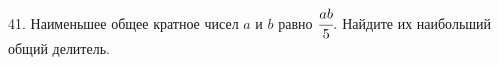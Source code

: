 41. Наименьшее общее кратное чисел $a$ и $b$ равно $\cfrac{ab}{5}.$ Найдите их наибольший общий делитель.\\
